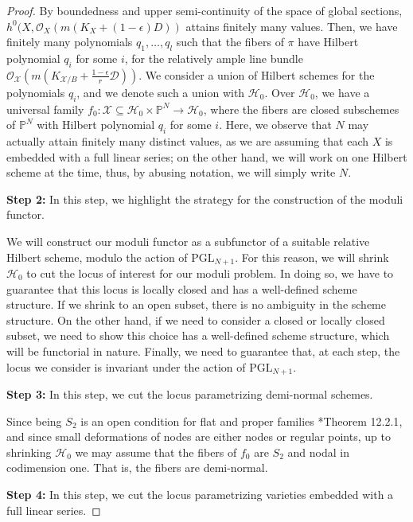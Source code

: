 \documentclass{amsart}
\newcommand{\bP}{\mathbb{P}}
\newcommand{\sH}{\mathscr{H}}
\newcommand{\sX}{\mathscr{X}}
\newcommand{\cD}{\mathcal{D}}
\newcommand{\cO}{\mathcal{O}}
\newcommand{\cX}{\mathcal{X}}
\theoremstyle{definition}
\def\K#1.{K_{#1}}
\begin{document}
\begin{proof}
By boundedness and upper semi-continuity of the space of global sections, $h^0(X,\cO_X (m(K_X+(1-\epsilon)D))$ attains finitely many values.
Then, we have finitely many polynomials $q_1,\ldots,q_l$ such that the fibers of $\pi$ have Hilbert polynomial $q_i$ for some $i$, for the relatively ample line bundle $\cO_\cX(m(\K \cX/B.+\frac{1-\epsilon}{r}\cD))$.
We consider a union of Hilbert schemes for the polynomials $q_i$, and we denote such a union with $\sH_0$.
Over $\sH_0$, we have a universal family $f_0 \colon \sX\subseteq \sH_0\times \bP^N\to \sH_0$, where the fibers are closed subschemes of $\bP^N$ with Hilbert polynomial $q_i$ for some $i$.
Here, we observe that $N$ may actually attain finitely many distinct values, as we are assuming that each $X$ is embedded with a full linear series; on the other hand, we will work on one Hilbert scheme at the time, thus, by abusing notation, we will simply write $N$.

{\bf Step 2:} In this step, we highlight the strategy for the construction of the moduli functor.

We will construct our moduli functor as a subfunctor of a suitable relative Hilbert scheme, modulo the action of $\mathrm{PGL}_{N+1}$.
For this reason, we will shrink $\sH_0$ to cut the locus of interest for our moduli problem.
In doing so, we have to guarantee that this locus is locally closed and has a well-defined scheme structure.
If we shrink to an open subset, there is no ambiguity in the scheme structure.
On the other hand, if we need to consider a closed or locally closed subset, we need to show this choice has a well-defined scheme structure, which will be functorial in nature.
Finally, we need to guarantee that, at each step, the locus we consider is invariant under the action of $\mathrm{PGL}_{N+1}$.

{\bf Step 3:} In this step, we cut the locus parametrizing demi-normal schemes.

Since being $S_2$ is an open condition for flat and proper families \cite{EGAIV}*{Theorem 12.2.1}, and since small deformations of nodes are either nodes or regular points, up to shrinking $\sH_0$ we may assume that the fibers of $f_0$ are $S_2$ and nodal in codimension one.
That is, the fibers are demi-normal.

{\bf Step 4:} In this step, we cut the locus parametrizing varieties embedded with a full linear series.


\end{proof}
\end{document}
